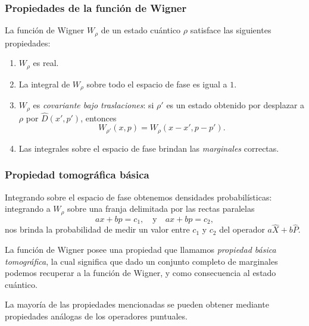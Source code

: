 \documentclass[10pt]{beamer}
\begin{document}
  \begin{frame}
    \frametitle{Propiedades de la función de Wigner}

    La función de Wigner $W_\rho$ de un estado cuántico
    $\rho$ satisface las siguientes propiedades:

    \vspace{5pt}

    \begin{enumerate}
      \item $W_\rho$ es real.
      \item La integral de $W_\rho$ sobre todo el espacio de
        fase es igual a $1$.
      \item $W_\rho$ es \textit{covariante bajo
        traslaciones}: si $\rho'$ es un estado obtenido por
        desplazar a $\rho$ por $\hat D(x',p')$, entonces
        \begin{equation}
          W_{\rho'}(x,p)
          = W_\rho(x-x',p-p').
        \end{equation}
      \item Las integrales sobre el espacio de fase brindan
        las \textit{marginales} correctas.
    \end{enumerate}
  \end{frame}

  \begin{frame}
    \frametitle{Propiedad tomográfica básica}

    Integrando sobre el espacio de fase obtenemos densidades
    probabilísticas: integrando a $W_\rho$ sobre una franja
    delimitada por las rectas paralelas
    \[
      ax+bp=c_1,
      \quad \text{y} \quad ax+bp=c_2,
    \]
    nos brinda la probabilidad de medir un
    valor entre $c_1$  y $c_2$ del operador $a \hat X + b
    \hat P$.

    \vspace{15pt}

    \pause

    La función de Wigner posee una propiedad que llamamos
    \textit{propiedad básica tomográfica}, la cual significa
    que dado un conjunto completo de marginales podemos
    recuperar a la función de Wigner, y como consecuencia al
    estado cuántico.

    \vspace{15pt}

    \pause

    La mayoría de las propiedades mencionadas se pueden
    obtener mediante propiedades análogas de los operadores
    puntuales.
  \end{frame}
\end{document}
